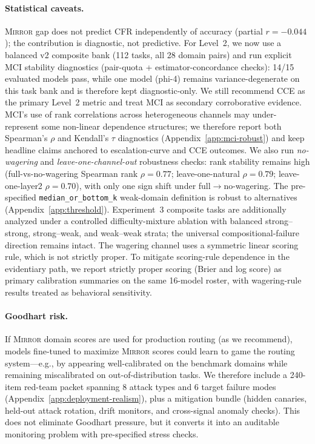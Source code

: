 \documentclass[10pt]{article}
\newcommand{\mirror}{\textsc{Mirror}}
\newcommand{\MCI}{MCI}
\newcommand{\CCE}{CCE}
\newcommand{\CFR}{CFR}
\begin{document}
\paragraph{Statistical caveats.}
\mirror{} gap does not predict \CFR{} independently of accuracy (partial $r = -0.044$); the contribution is diagnostic, not predictive. For Level~2, we now use a balanced v2 composite bank (112 tasks, all 28 domain pairs) and run explicit MCI stability diagnostics (pair-quota + estimator-concordance checks): 14/15 evaluated models pass, while one model (phi-4) remains variance-degenerate on this task bank and is therefore kept diagnostic-only. We still recommend \CCE{} as the primary Level~2 metric and treat \MCI{} as secondary corroborative evidence.
MCI's use of rank correlations across heterogeneous channels may under-represent
some non-linear dependence structures; we therefore report both Spearman's $\rho$
and Kendall's $\tau$ diagnostics (Appendix~\ref{app:mci-robust}) and keep headline
claims anchored to escalation-curve and \CCE{} outcomes. We also run
\textit{no-wagering} and \textit{leave-one-channel-out} robustness checks:
rank stability remains high (full-vs-no-wagering Spearman rank
$\rho=0.77$; leave-one-natural $\rho=0.79$; leave-one-layer2 $\rho=0.70$),
with only one sign shift under full$\to$no-wagering.
The pre-specified \texttt{median\_or\_bottom\_k} weak-domain definition is robust to alternatives (Appendix~\ref{app:threshold}).
Experiment~3 composite tasks are additionally analyzed under a controlled
difficulty-mixture ablation with balanced strong--strong, strong--weak, and
weak--weak strata; the universal compositional-failure direction remains intact.
The wagering channel uses a symmetric linear scoring rule, which is not strictly
proper. To mitigate scoring-rule dependence in the evidentiary path, we report
strictly proper scoring (Brier and log score) as primary calibration summaries
on the same 16-model roster, with wagering-rule results treated as behavioral
sensitivity.

\paragraph{Goodhart risk.} If \mirror{} domain scores are used for production routing (as we recommend), models fine-tuned to maximize \mirror{} scores could learn to game the routing system---e.g., by appearing well-calibrated on the benchmark domains while remaining miscalibrated on out-of-distribution tasks. We therefore include a 240-item red-team packet spanning 8 attack types and 6 target failure modes (Appendix~\ref{app:deployment-realism}), plus a mitigation bundle (hidden canaries, held-out attack rotation, drift monitors, and cross-signal anomaly checks). This does not eliminate Goodhart pressure, but it converts it into an auditable monitoring problem with pre-specified stress checks.
\end{document}
